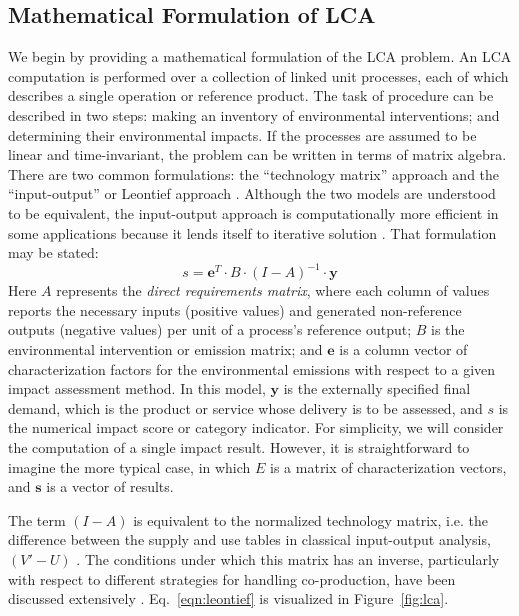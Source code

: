 \subsection{Mathematical Formulation of LCA}

We begin by providing a mathematical formulation of the LCA problem.  An LCA computation is performed over a collection of linked unit processes, each of which describes a single operation or reference product.  The task of procedure can be described in two steps: making an inventory of environmental interventions; and determining their environmental impacts.  If the processes are assumed to be linear and time-invariant, the problem can be written in terms of matrix algebra.  There are two common formulations: the ``technology matrix'' approach and the ``input-output'' or Leontief approach \citep{Heijungs2002, Pauliuk_2015_framework}.  Although the two models are understood to be equivalent, the input-output approach is computationally more efficient in some applications because it lends itself to iterative solution \citep{Peters_JLCA_2007}.  That formulation may be stated:
\begin{equation}
s = \mathbf{e}^T \cdot B \cdot \left(I - A\right)^{-1} \cdot \mathbf{y}
\label{eqn:leontief}
\end{equation}
Here $A$ represents the \emph{direct requirements matrix}, where each column of values reports the necessary inputs (positive values) and generated non-reference outputs (negative values)%
per unit of a process's reference output; $B$ is the environmental intervention or emission matrix; and $\mathbf{e}$ is a column vector of characterization factors for the environmental emissions with respect to a given impact assessment method.  In this model, $\mathbf{y}$ is the externally specified final demand, which is the product or service whose delivery is to be assessed, and $s$ is the numerical impact score or category indicator.  For simplicity, we will consider the computation of a single impact result.  However, it is straightforward to imagine the more typical case, in which $E$ is a matrix of characterization vectors, and $\mathbf{s}$ is a vector of results.

The term $(I-A)$ is equivalent to the normalized technology matrix, i.e. the difference between the supply and use tables in classical input-output analysis, $(V'-U)$ \citep{Suh_JIE_2010}.  The conditions under which this matrix has an inverse, particularly with respect to different strategies for handling co-production, have been discussed extensively \citep{Majeau_Bettez_2014}.  Eq.~\ref{eqn:leontief} is visualized in Figure~\ref{fig:lca}. 


